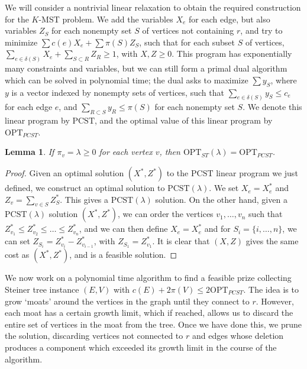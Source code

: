 \documentclass{article}
\theoremstyle{plain}
\newtheorem{lemma}{Lemma}
\begin{document}
We will consider a nontrivial linear relaxation to obtain the required construction for the $K$-MST problem. We add the variables $X_e$ for each edge, but also variables $Z_S$ for each nonempty set $S$ of vertices not containing $r$, and try to minimize $\sum c(e) X_e + \sum \pi(S) Z_S$, such that for each subset $S$ of vertices, $\sum_{e \in \delta(S)} X_e + \sum_{S \subset R} Z_R \geq 1$, with $X,Z \geq 0$. This program has exponentially many constraints and variables, but we can still form a primal dual algorithm which can be solved in polynomial time; the dual asks to maximize $\sum y_S$, where $y$ is a vector indexed by nonempty sets of vertices, such that $\sum_{e \in \delta(S)} y_S \leq c_e$ for each edge $e$, and $\sum_{R \subset S} y_R \leq \pi(S)$ for each nonempty set $S$. We denote this linear program by $\text{PCST}$, and the optimal value of this linear program by $\text{OPT}_{PCST}$.

\begin{lemma}
    If $\pi_v = \lambda \geq 0$ for each vertex $v$, then $\text{OPT}_{ST}(\lambda) = \text{OPT}_{PCST}$.
\end{lemma}
\begin{proof}
    Given an optimal solution $(X^*,Z^*)$ to the $\text{PCST}$ linear program we just defined, we construct an optimal solution to  $\text{PCST}(\lambda)$. We set $X_e = X^*_e$ and $Z_v = \sum_{v \in S} Z^*_S$. This gives a $\text{PCST}(\lambda)$ solution. On the other hand, given a $\text{PCST}(\lambda)$ solution $(X^*,Z^*)$, we can order the vertices $v_1, \dots, v_n$ such that $Z^*_{v_1} \leq Z^*_{v_2} \leq \dots \leq Z^*_{v_n}$, and we can then define $X_e = X^*_e$ and for $S_i = \{ i, \dots, n \}$, we can set $Z_{S_i} = Z^*_{v_i} - Z^*_{v_{i-1}}$, with $Z_{S_1} = Z^*_{v_1}$. It is clear that $(X,Z)$ gives the same cost as $(X^*,Z^*)$, and is a feasible solution.
\end{proof}

We now work on a polynomial time algorithm to find a feasible prize collecting Steiner tree instance $(E,V)$ with $c(E) + 2 \pi(V) \leq 2 \text{OPT}_{PCST}$. The idea is to grow `moats' around the vertices in the graph until they connect to $r$. However, each moat has a certain growth limit, which if reached, allows us to discard the entire set of vertices in the moat from the tree. Once we have done this, we prune the solution, discarding vertices not connected to $r$ and edges whose deletion produces a component which exceeded its growth limit in the course of the algorithm.
\end{document}
